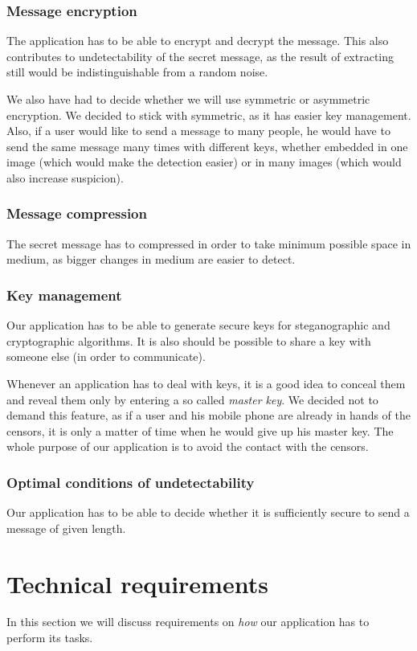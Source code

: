 \subsubsection{Message encryption}
The application has to be able to encrypt and decrypt the message. This also contributes
to undetectability of the secret message, as the result of extracting still would be 
indistinguishable from a random noise.

We also have had to decide whether we will use symmetric or asymmetric
encryption. We decided to stick with symmetric, as it has easier key management.
Also, if a user would like to send a message to many people, he would have to
send the same message many times with different keys, whether embedded in one 
image (which would make the detection easier) or in many images (which would
also increase suspicion).

\subsubsection{Message compression}
The secret message has to compressed in order to take minimum possible space in medium,
as bigger changes in medium are easier to detect.

\subsubsection{Key management}
Our application has to be able to generate secure keys for steganographic and
cryptographic algorithms. It is also should be possible to share a key with someone
else (in order to communicate).

Whenever an application has to deal with keys, it is a good idea to conceal them
and reveal them only by entering a so called \emph{master key}. We decided not to demand
this feature, as if a user and his mobile phone are already in hands of the censors, it is only 
a matter of time when he would give up his master key. The whole purpose of our application
is to avoid the contact with the censors.

\subsubsection{Optimal conditions of undetectability}
Our application has to be able to decide whether it is sufficiently secure to 
send a message of given length. 



\section{Technical requirements}
In this section we will discuss requirements on \emph{how} our application has
to perform its tasks.

